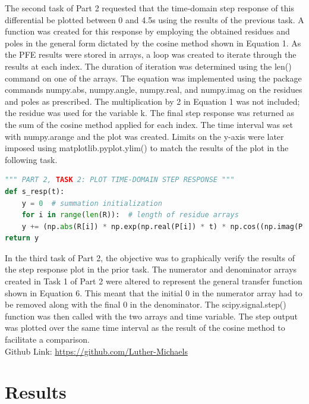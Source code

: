 \documentclass[12pt]{report}
\begin{document}
The second task of Part 2 requested that the time-domain step response of this differential be plotted between 0 and 4.5s using the results of the previous task. A function was created for this response by employing the obtained residues and poles in the general form dictated by the cosine method shown in Equation 1. As the PFE results were stored in arrays, a loop was created to iterate through the results at each index. The duration of iteration was determined using the len() command on one of the arrays. The equation was implemented using the package commands numpy.abs, numpy.angle, numpy.real, and numpy.imag on the residues and poles as prescribed. The multiplication by 2 in Equation 1 was not included; the residue was used for the variable k. The final step response was returned as the sum of the cosine method applied for each index. The time interval was set with numpy.arange and the plot was created. Limits on the y-axis were later imposed using matplotlib.pyplot.ylim() to match the results of the plot in the following task. \\

\begin{lstlisting}[language=Python]
""" PART 2, TASK 2: PLOT TIME-DOMAIN STEP RESPONSE """
def s_resp(t):
	y = 0  # summation initialization
	for i in range(len(R)):  # length of residue arrays
	y += (np.abs(R[i]) * np.exp(np.real(P[i]) * t) * np.cos((np.imag(P[i]) * t) + np.angle(R[i])) * u(t))
return y
\end{lstlisting}

In the third task of Part 2, the objective was to graphically verify the results of the step response plot in the prior task. The numerator and denominator arrays created in Task 1 of Part 2 were altered to represent the general transfer function shown in Equation 6. This meant that the initial 0 in the numerator array had to be removed along with the final 0 in the denominator. The scipy.signal.step() function was then called with the two arrays and time variable. The step output was plotted over the same time interval as the result of the cosine method to facilitate a comparison. \\

Github Link: \url{https://github.com/Luther-Michaels} \\
	
\section{Results}
\end{document}
